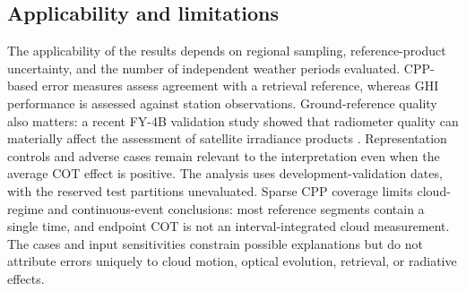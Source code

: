 \documentclass[11pt]{article}
\begin{document}
\subsection{Applicability and limitations}
The applicability of the results depends on regional sampling, reference-product uncertainty, and the number of independent weather periods evaluated. CPP-based error measures assess agreement with a retrieval reference, whereas GHI performance is assessed against station observations. Ground-reference quality also matters: a recent FY-4B validation study showed that radiometer quality can materially affect the assessment of satellite irradiance products \cite{chen2025fy4b}. Representation controls and adverse cases remain relevant to the interpretation even when the average COT effect is positive. The analysis uses development-validation dates, with the reserved test partitions unevaluated. Sparse CPP coverage limits cloud-regime and continuous-event conclusions: most reference segments contain a single time, and endpoint COT is not an interval-integrated cloud measurement. The cases and input sensitivities constrain possible explanations but do not attribute errors uniquely to cloud motion, optical evolution, retrieval, or radiative effects.
\end{document}
